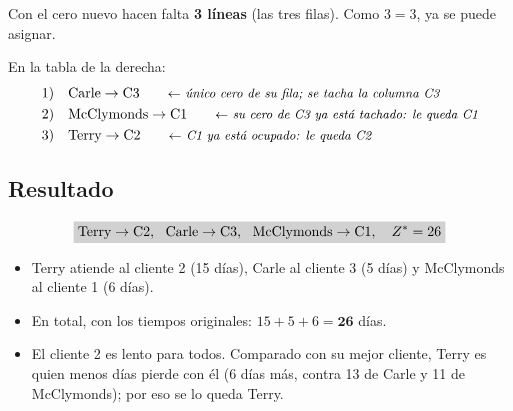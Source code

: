 \documentclass[11pt,a4paper]{article}
\newcommand{\marco}[3]{%
  \foreach \i in {2,...,#2} \foreach \j in {2,...,#3}
    \draw[gray!60, very thin] (#1-\i-\j.north west) rectangle (#1-\i-\j.south east);
  \draw[semithick] (#1-2-2.north west) rectangle (#1-#2-#3.south east);}
\newcommand{\tfila}[3]{\draw[tapa] (#1-#2-2.west) -- (#1-#2-#3.east);}
\newcommand{\pie}[2]{\node[below=1.5mm of #1, font=\scriptsize\itshape] {#2};}
\newcommand{\cero}[1]{\node[asig] at (#1) {};}
\newcommand{\flecha}[3]{\draw[-{Stealth[length=2.4mm]}, thick] (#1.east) -- node[above, font=\scriptsize, align=center] {#3} (#1.east -| #2.west);}
\begin{document}
\begin{center}
\end{center}
Con el cero nuevo hacen falta \textbf{3 líneas} (las tres filas). Como $3 = 3$, ya se puede asignar.

En la tabla de la derecha:
\begin{align*}
1)\quad & \text{Carle} \to \text{C3} \nota{único cero de su fila; se tacha la columna C3}\\
2)\quad & \text{McClymonds} \to \text{C1} \nota{su cero de C3 ya está tachado: le queda C1}\\
3)\quad & \text{Terry} \to \text{C2} \nota{C1 ya está ocupado: le queda C2}
\end{align*}

\subsection*{Resultado}
\[
\res{\text{Terry} \to \text{C2},\ \ \text{Carle} \to \text{C3},\ \ \text{McClymonds} \to \text{C1},\quad Z^* = 26}
\]
\begin{itemize}[itemsep=2pt]
  \item Terry atiende al cliente 2 (15 días), Carle al cliente 3 (5 días) y McClymonds al cliente 1 (6 días).
  \item En total, con los tiempos originales: $15 + 5 + 6 = \mathbf{26}$ días.
  \item El cliente 2 es lento para todos. Comparado con su mejor cliente, Terry es quien menos días pierde con él
        (6 días más, contra 13 de Carle y 11 de McClymonds); por eso se lo queda Terry.
\end{itemize}
\end{document}
